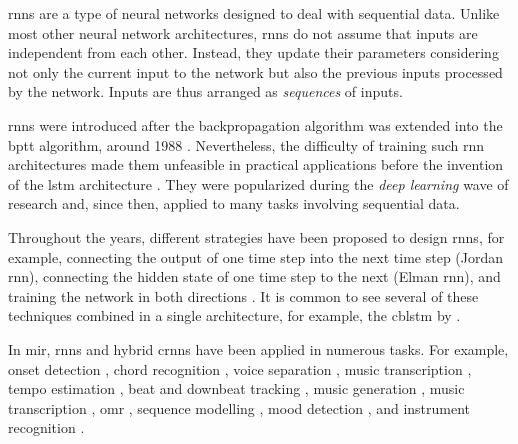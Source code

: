 

\glspl{rnn} are a type of neural networks designed to deal
with sequential data. Unlike most other neural network
architectures, \glspl{rnn} do not assume that inputs are
independent from each other. Instead, they update their
parameters considering not only the current input to the
network but also the previous inputs processed by the
network. Inputs are thus arranged as \emph{sequences} of
inputs.

\glspl{rnn} were introduced after the backpropagation
algorithm \parencite{rumelhart1988learning} was extended
into the \gls{bptt} algorithm, around 1988
\parencite{werbos1988generalization,
werbos1990backpropagation}. Nevertheless, the difficulty of
training such \gls{rnn} architectures made them unfeasible
in practical applications before the invention of the
\gls{lstm} architecture \parencite{hochreiter1997long}. They
were popularized during the \emph{deep learning} wave of
research and, since then, applied to many tasks involving
sequential data.

Throughout the years, different strategies have been
proposed to design \glspl{rnn}, for example, connecting the
output of one time step into the next time step (Jordan
\gls{rnn}), connecting the hidden state of one time step to
the next (Elman \gls{rnn}), and training the network in both
directions \parencite{schuster1997bidirectional}. It is
common to see several of these techniques combined in a
single architecture, for example, the \gls{cblstm} by
\textcite{vogl2017drum}.

In \gls{mir}, \glspl{rnn} and hybrid \glspl{crnn} have been
applied in numerous tasks. For example, onset detection
\parencite{eyben2010universal}, chord recognition
\parencite{boulangerlewandowski2013audio, sigtia2016endend,
sears2018evaluating}, voice separation
\parencite{huang2014singingvoice}, music transcription
\parencite{sigtia2014rnnbased}, tempo estimation
\parencite{bock2015accurate}, beat and downbeat tracking
\parencite{bock2016joint, krebs2016downbeat}, music
generation \parencite{liu2016predicting, liang2017automatic,
lim2017chord}, music transcription
\parencite{rigaud2016singing, sigtia2016endend,
southall2016automatic, vogl2016recurrent,
southall2017automatic, vogl2017drum, basaran2018main},
\gls{omr} \parencite{calvozaragoza2017onestep,
wel2017optical, calvozaragoza2018cameraprimus}, sequence
modelling \parencite{ycart2017study}, mood detection
\parencite{delbouys2018music}, and instrument recognition
\parencite{gururani2018instrument}.



